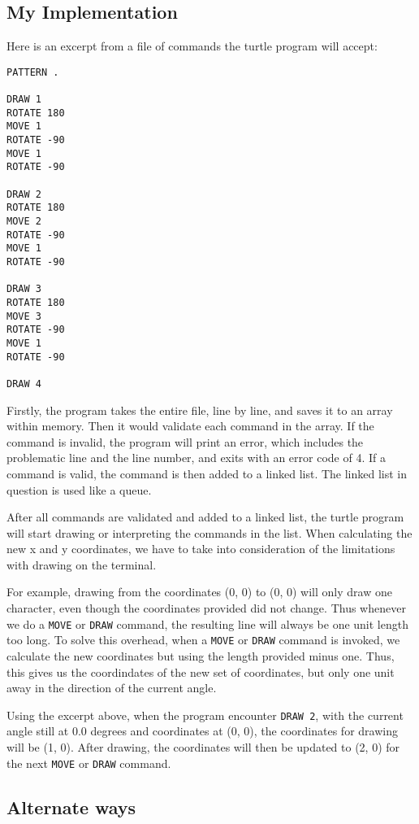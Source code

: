 \documentclass[a4paper, 12pt, titlepage]{article}
\newcommand{\code}[1]{\small\texttt{#1}\normalsize}
\begin{document}
\subsection{My Implementation}

Here is an excerpt from a file of commands the turtle program will accept:

\begin{lstlisting}
PATTERN .

DRAW 1
ROTATE 180
MOVE 1
ROTATE -90
MOVE 1
ROTATE -90

DRAW 2
ROTATE 180
MOVE 2
ROTATE -90
MOVE 1
ROTATE -90

DRAW 3
ROTATE 180
MOVE 3
ROTATE -90
MOVE 1
ROTATE -90

DRAW 4
\end{lstlisting}

Firstly, the program takes the entire file, line by line, and saves it to
an array within memory. Then it would validate each command in the array. 
If the command is invalid, the program will print an error, which includes 
the problematic line and the line number, and exits with an error code of 
4. If a command is valid, the command is then added to a linked list. The 
linked list in question is used like a queue.

After all commands are validated and added to a linked list, the turtle 
program will start drawing or interpreting the commands in the list. When 
calculating the new x and y coordinates, we have to take into consideration 
of the limitations with drawing on the terminal.

For example, drawing from the coordinates (0, 0) to (0, 0) will only draw 
one character, even though the coordinates provided did not change. 
Thus whenever we do a \code{MOVE} or \code{DRAW} command, the resulting 
line will always be one unit length too long. To solve this overhead, 
when a \code{MOVE} or \code{DRAW} command is invoked, we calculate the 
new coordinates but using the length provided minus one. Thus, this gives 
us the coordindates of the new set of coordinates, but only one unit away 
in the direction of the current angle.

Using the excerpt above, when the program encounter \code{DRAW 2}, 
with the current angle still at 0.0 degrees and coordinates at (0, 0), 
the coordinates for drawing will be (1, 0). After drawing, the coordinates 
will then be updated to (2, 0) for the next \code{MOVE} or \code{DRAW} 
command.

\subsection{Alternate ways}
\end{document}
